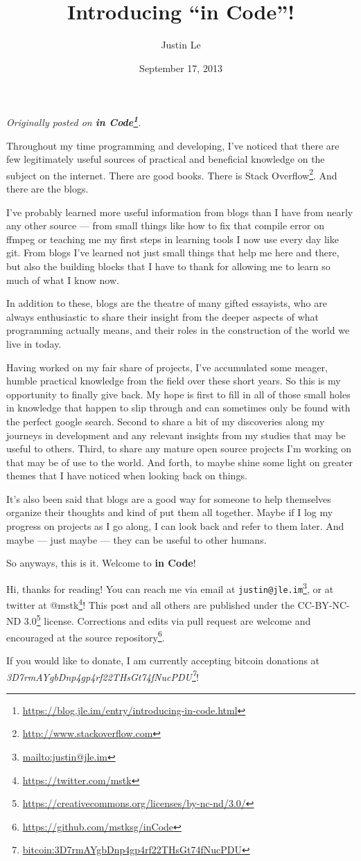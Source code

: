 \documentclass[]{article}
\title{Introducing ``in Code''!}
\author{Justin Le}
\date{September 17, 2013}
\renewcommand{\href}[2]{#2\footnote{\url{#1}}}
\begin{document}
\maketitle

\emph{Originally posted on
\textbf{\href{https://blog.jle.im/entry/introducing-in-code.html}{in Code}}.}

Throughout my time programming and developing, I've noticed that there are few
legitimately useful sources of practical and beneficial knowledge on the subject
on the internet. There are good books. There is
\href{http://www.stackoverflow.com}{Stack Overflow}. And there are the blogs.

I've probably learned more useful information from blogs than I have from nearly
any other source --- from small things like how to fix that compile error on
ffmpeg or teaching me my first steps in learning tools I now use every day like
git. From blogs I've learned not just small things that help me here and there,
but also the building blocks that I have to thank for allowing me to learn so
much of what I know now.

In addition to these, blogs are the theatre of many gifted essayists, who are
always enthusiastic to share their insight from the deeper aspects of what
programming actually means, and their roles in the construction of the world we
live in today.

Having worked on my fair share of projects, I've accumulated some meager, humble
practical knowledge from the field over these short years. So this is my
opportunity to finally give back. My hope is first to fill in all of those small
holes in knowledge that happen to slip through and can sometimes only be found
with the perfect google search. Second to share a bit of my discoveries along my
journeys in development and any relevant insights from my studies that may be
useful to others. Third, to share any mature open source projects I'm working on
that may be of use to the world. And forth, to maybe shine some light on greater
themes that I have noticed when looking back on things.

It's also been said that blogs are a good way for someone to help themselves
organize their thoughts and kind of put them all together. Maybe if I log my
progress on projects as I go along, I can look back and refer to them later. And
maybe --- just maybe --- they can be useful to other humans.

So anyways, this is it. Welcome to \textbf{in Code}!

Hi, thanks for reading! You can reach me via email at
\href{mailto:justin@jle.im}{\nolinkurl{justin@jle.im}}, or at twitter at
\href{https://twitter.com/mstk}{@mstk}! This post and all others are published
under the \href{https://creativecommons.org/licenses/by-nc-nd/3.0/}{CC-BY-NC-ND
3.0} license. Corrections and edits via pull request are welcome and encouraged
at \href{https://github.com/mstksg/inCode}{the source repository}.

If you would like to donate, I am currently accepting bitcoin donations at
\emph{\href{bitcoin:3D7rmAYgbDnp4gp4rf22THsGt74fNucPDU}{3D7rmAYgbDnp4gp4rf22THsGt74fNucPDU}}!
\end{document}
